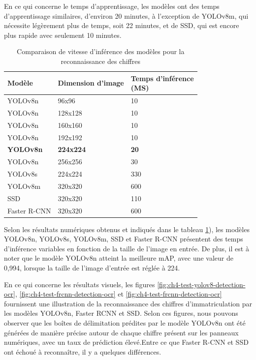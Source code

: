 En ce qui concerne le temps d'apprentissage, les modèles ont des temps d'apprentissage similaires, d'environ 20 minutes, à l'exception de YOLOv8m, qui nécessite légèrement plus de temps, soit 22 minutes, et de SSD, qui est encore plus rapide avec seulement 10 minutes.

\begin{table}[H]
    \centering
    \begin{tabular}{|l|l|l|}
    \hline
        Modèle  & Dimension d'image &  \shortstack{Temps d'inférence \\ (MS) }\\ \hline
        YOLOv8n & 96x96& 10 \\ \hline
        YOLOv8n & 128x128 & 10 \\ \hline
        YOLOv8n & 160x160 & 10 \\ \hline
        YOLOv8n & 192x192 & 10 \\ \hline
        \textbf{YOLOv8n} & \textbf{224x224} & \textbf{20} \\ \hline
        YOLOv8n & 256x256 & 30 \\ \hline
        YOLOv8s & 224x224 & 330 \\ \hline
        YOLOv8m & 320x320 & 600 \\ \hline
        SSD & 320x320 & 110 \\ \hline
        Faster R-CNN & 320x320 & 600 \\ \hline
    \end{tabular}
    \caption{Comparaison de vitesse d'inférence des modèles pour la reconnaissance des chiffres}
    \label{table:ch4-test_speed_ocr_allmodels}
\end{table}

Selon les résultats numériques obtenus et indiqués dans le tableau \ref{table:ch4-test_speed_ocr_allmodels}), les modèles YOLOv8n, YOLOv8s, YOLOv8m, SSD et Faster R-CNN présentent des temps d'inférence variables en fonction de la taille de l'image en entrée. De plus, il est à noter que le modèle YOLOv8n atteint la meilleure mAP, avec une valeur de 0,994, lorsque la taille de l'image d'entrée est réglée à 224.

En ce qui concerne les résultats visuels, les figures \ref{fig:ch4-test-yolov8-detection-ocr}, \ref{fig:ch4-test-frcnn-detection-ocr} et \ref{fig:ch4-test-frcnn-detection-ocr} fournissent une illustration de la reconnaissance des chiffres d’immatriculation par les modèles YOLOv8n, Faster RCNN et SSD. 
Selon ces figures, nous pouvons observer que les boîtes de délimitation prédites par le modèle YOLOv8n ont été générées de manière précise autour de chaque chiffre présent sur les panneaux numériques, avec un taux de prédiction élevé.Entre ce que Faster R-CNN et SSD ont échoué à reconnaître, il y a quelques différences.

